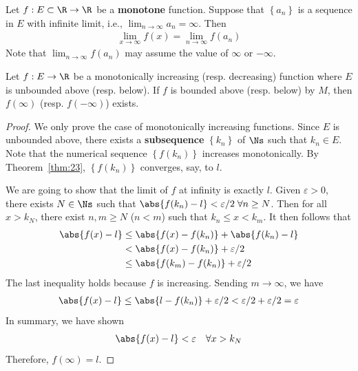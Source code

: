 \documentclass[thmcnt=section, 12pt]{elegantbook}
\begin{document}

\begin{proposition}
    Let $f: E \subset \R \to \R$ be a \textbf{monotone} function. Suppose that $\left\{a_n\right\}$ is a sequence in $E$ with infinite limit, i.e., $\lim_{n \to \infty} a_n = \infty$. Then 
    \begin{align*}
        \lim_{x \to \infty} f(x)
        = \lim_{n \to \infty} f(a_n)
    \end{align*}
    Note that $\lim_{n \to \infty} f(a_n)$ may assume the value of $\infty$ or $-\infty$.
\end{proposition}


\begin{proposition} \label{pro:2}
    Let $f: E \to \R$ be a monotonically increasing (resp. decreasing) function where $E$ is unbounded above (resp. below). If $f$ is bounded above (resp. below) by $M$, then $f(\infty)$ (resp. $f(-\infty)$) exists.
\end{proposition}

\begin{proof}
    We only prove the case of monotonically increasing functions. Since $E$ is unbounded above, there exists a \textbf{subsequence} $\left\{k_n\right\}$ of $\Ns$ such that $k_n \in E$. Note that the numerical sequence $\left\{f(k_n)\right\}$ increases monotonically. By Theorem~\ref{thm:23}, $\left\{f(k_n)\right\}$ converges, say, to $l$. 
    \par We are going to show that the limit of $f$ at infinity is exactly $l$. Given $\varepsilon > 0$, there exists $N \in \Ns$ such that $\abs{f(k_n) - l} < \varepsilon / 2 \; \forall n \geq N$. Then for all $x > k_N$, there exist $n, m \geq N$ ($n < m$) such that $k_n \leq x < k_m$. It then follows that 
    \begin{align*}
        \abs{f(x) - l}
        &\leq \abs{f(x) - f(k_n)} + \abs{f(k_n) - l} \\
        &< \abs{f(x) - f(k_n)} + \varepsilon / 2 \\
        &\leq \abs{f(k_m) - f(k_n)} + \varepsilon / 2
    \end{align*}
    The last inequality holds because $f$ is increasing. Sending $m \to \infty$, we have 
    \begin{align*}
        \abs{f(x) - l}
        \leq \abs{l - f(k_n)} + \varepsilon / 2
        < \varepsilon / 2 + \varepsilon / 2
        = \varepsilon
    \end{align*}
    In summary, we have shown
    \begin{align*}
        \abs{f(x) - l} < \varepsilon
        \quad \forall x > k_N
    \end{align*}
    Therefore, $f(\infty) = l$.
\end{proof}
\end{document}
